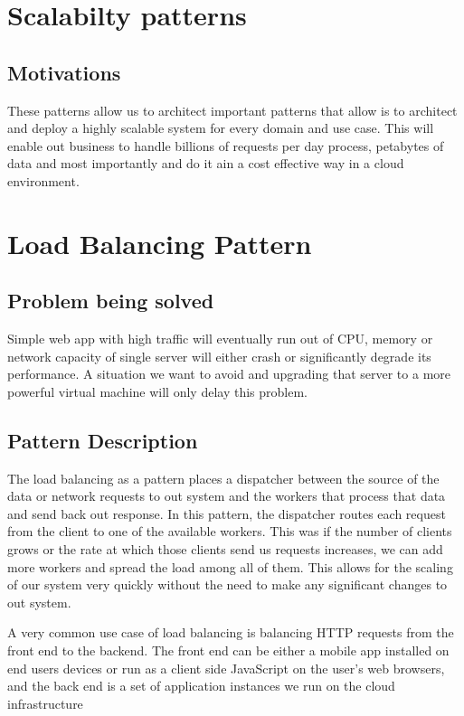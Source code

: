 \section{Scalabilty patterns}

\subsection{Motivations}
These patterns allow us to architect important patterns that allow is to architect and deploy a highly scalable system for every domain and use case.
This will enable out business to handle billions of requests per day process, petabytes of data and most importantly and do it ain a cost effective way in a cloud environment.


\section{Load Balancing Pattern}

\subsection{Problem being solved}
Simple web app with high traffic will eventually run out of CPU, memory or network capacity of single server will either crash or significantly degrade its performance.
A situation we want to avoid and upgrading that server to a more powerful virtual machine will only delay this problem.

\subsection{Pattern Description}
The load balancing as a pattern places a dispatcher between the source of the data or network requests to out system and the workers that process that data and send back out response.
In this pattern, the dispatcher routes each request from the client to one of the available workers.
This was if the number of clients grows or the rate at which those clients send us requests increases, we can add more workers and spread the load among all of them.
This allows for the scaling of our system very quickly without the need to make any significant changes to out system.

A very common use case of load balancing is balancing HTTP requests from the front end to the backend.
The front end can be either a mobile app installed on end users devices or run as a client side JavaScript on the user's web browsers,
and the back end is a set of application instances we run on the cloud infrastructure

